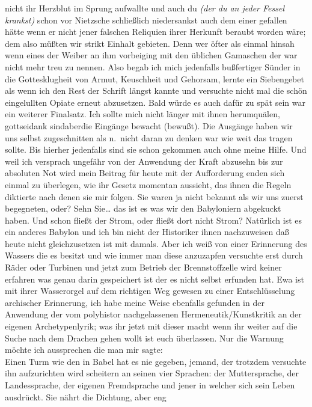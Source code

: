 \documentclass[
]{article}
\begin{document}
nicht ihr Herzblut im Sprung aufwallte und auch du \emph{(der du an
jeder Fessel krankst)} schon vor Nietzsche schließlich niedersankst auch
dem einer gefallen hätte wenn er nicht jener falschen Reliquien ihrer
Herkunft beraubt worden wäre; dem also müßten wir strikt Einhalt
gebieten. Denn wer öfter als einmal hinsah wenn eines der Weiber an ihm
vorbeiging mit den üblichen Gamaschen der war nicht mehr treu zu nennen.
Also begab ich mich jedenfalls bußfertiger Sünder in die Gottesklugheit
von Armut, Keuschheit und Gehorsam, lernte ein Siebengebet als wenn ich
den Rest der Schrift längst kannte und versuchte nicht mal die schön
eingelullten Opiate erneut abzusetzen. Bald würde es auch dafür zu spät
sein war ein weiterer Finalsatz. Ich sollte mich nicht länger mit ihnen
herumquälen, gottseidank sindaberdie Eingänge bewacht (bewußt). Die
Ausgänge haben wir uns selbst zugeschnitten als n.~nicht daran zu denken
war wie weit das tragen sollte. Bis hierher jedenfalls sind sie schon
gekommen auch ohne meine Hilfe. Und weil ich versprach ungefähr von der
Anwendung der Kraft abzusehn bis zur absoluten Not wird mein Beitrag für
heute mit der Aufforderung enden sich einmal zu überlegen, wie ihr
Gesetz momentan aussieht, das ihnen die Regeln diktierte nach denen sie
mir folgen. Sie waren ja nicht bekannt als wir uns zuerst begegneten,
oder? Sehn Sie\ldots{} das ist es was wir den Babyloniern abgekuckt
haben. Und schon fließt der Strom, oder fließt dort nicht Strom?
Natürlich ist es ein anderes Babylon und ich bin nicht der Historiker
ihnen nachzuweisen daß heute nicht gleichzusetzen ist mit damals. Aber
ich weiß von einer Erinnerung des Wassers die es besitzt und wie immer
man diese anzuzapfen versuchte erst durch Räder oder Turbinen und jetzt
zum Betrieb der Brennstoffzelle wird keiner erfahren was genau darin
gespeichert ist der es nicht selbst erfunden hat. Ewa ist mit ihrer
Wasserorgel auf dem richtigen Weg gewesen zu einer Entschlüsselung
archischer Erinnerung, ich habe meine Weise ebenfalls gefunden in der
Anwendung der vom polyhistor nachgelassenen Hermeneutik/Kunstkritik an
der eigenen Archetypenlyrik; was ihr jetzt mit dieser macht wenn ihr
weiter auf die Suche nach dem Drachen gehen wollt ist euch überlassen.
Nur die Warnung möchte ich aussprechen die man mir sagte:\\
Einen Turm wie den in Babel hat es nie gegeben, jemand, der trotzdem
versuchte ihn aufzurichten wird scheitern an seinen vier Sprachen: der
Muttersprache, der Landessprache, der eigenen Fremdsprache und jener in
welcher sich sein Leben ausdrückt. Sie nährt die Dichtung, aber eng
\end{document}
